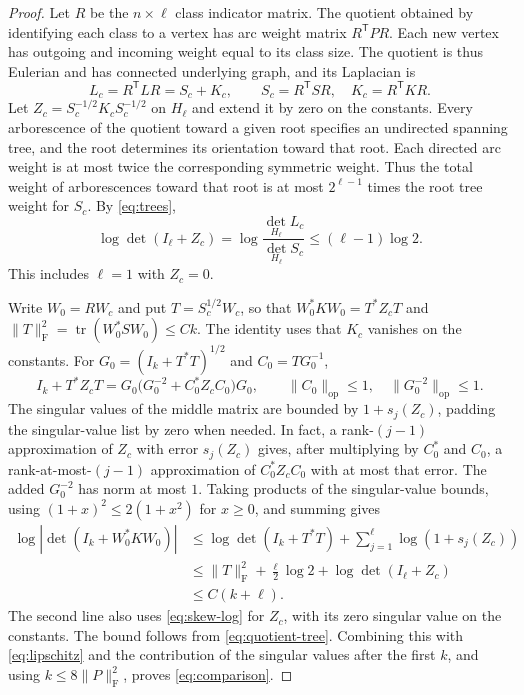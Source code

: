 \documentclass[11pt]{article}
\DeclareMathOperator{\tr}{tr}
\newcommand{\op}{\mathrm{op}}
\newcommand{\Frob}{\mathrm{F}}
\newcommand{\trans}{\mathsf{T}}
\begin{document}
\begin{proof}
Let \(R\) be the \(n\times\ell\) class indicator matrix. The quotient obtained by identifying each class to a vertex has arc weight matrix \(R^{\trans} P R\). Each new vertex has outgoing and incoming weight equal to its class size. The quotient is thus Eulerian and has connected underlying graph, and its Laplacian is
\[
 L_c=R^{\trans}LR=S_c+K_c,\qquad
 S_c=R^{\trans}SR,\quad K_c=R^{\trans}KR.
\]
Let \(Z_c=S_c^{-1/2}K_c S_c^{-1/2}\) on \(H_\ell\) and extend it by zero on the constants. Every arborescence of the quotient toward a given root specifies an undirected spanning tree, and the root determines its orientation toward that root. Each directed arc weight is at most twice the corresponding symmetric weight. Thus the total weight of arborescences toward that root is at most \(2^{\ell-1}\) times the root tree weight for \(S_c\). By \eqref{eq:trees},
\begin{equation}\label{eq:quotient-tree}
 \log\det(I_\ell+Z_c)
    =\log\frac{\det_{H_\ell}L_c}{\det_{H_\ell}S_c}
    \le(\ell-1)\log 2 .
\end{equation}
This includes \(\ell=1\) with \(Z_c=0\).

Write \(W_0=RW_c\) and put \(T=S_c^{1/2}W_c\), so that \(W_0^*KW_0=T^*Z_cT\) and \(\|T\|_{\Frob}^2=\tr(W_0^*SW_0)\le Ck\). The identity uses that \(K_c\) vanishes on the constants. For \(G_0=(I_k+T^*T)^{1/2}\) and \(C_0=T G_0^{-1}\),
\[
 I_k+T^*Z_cT=G_0\bigl(G_0^{-2}+C_0^*Z_cC_0\bigr)G_0,\qquad
 \|C_0\|_{\op}\le1,\quad \|G_0^{-2}\|_{\op}\le1.
\]
The singular values of the middle matrix are bounded by \(1+s_j(Z_c)\), padding the singular-value list by zero when needed. In fact, a rank-\((j-1)\) approximation of \(Z_c\) with error \(s_j(Z_c)\) gives, after multiplying by \(C_0^*\) and \(C_0\), a rank-at-most-\((j-1)\) approximation of \(C_0^*Z_cC_0\) with at most that error. The added \(G_0^{-2}\) has norm at most \(1\). Taking products of the singular-value bounds, using \((1+x)^2\le2(1+x^2)\) for \(x\ge0\), and summing gives
\begin{align*}
 \log|\det(I_k+W_0^*KW_0)|
 &\le \log\det(I_k+T^*T)+\sum_{j=1}^{\ell}\log(1+s_j(Z_c))\\
 &\le \|T\|_{\Frob}^2+\tfrac{\ell}{2}\log 2+\log\det(I_\ell+Z_c)\\
 &\le C(k+\ell).
\end{align*}
The second line also uses \eqref{eq:skew-log} for \(Z_c\), with its zero singular value on the constants. The bound follows from \eqref{eq:quotient-tree}. Combining this with \eqref{eq:lipschitz} and the contribution of the singular values after the first \(k\), and using \(k\le8\|P\|_{\Frob}^2\), proves \eqref{eq:comparison}.
\end{proof}
\end{document}
